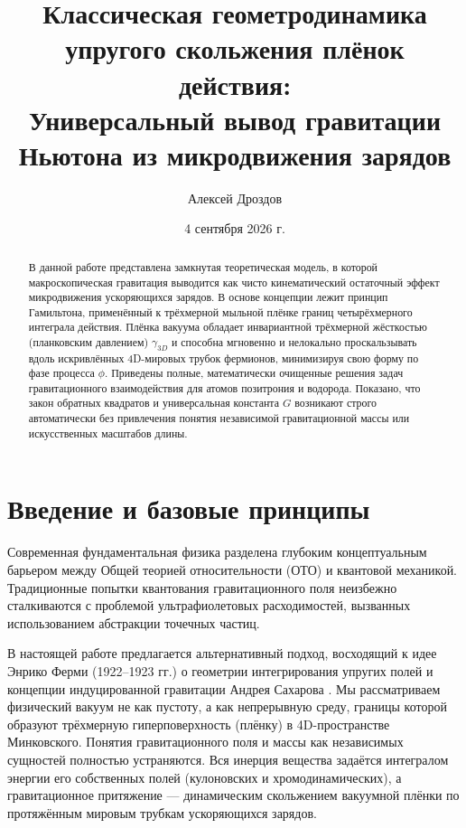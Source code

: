 \documentclass[twocolumn,PRD,amsmath,amssymb,superscriptaddress]{revtex4-1}
\begin{document}
\title{Классическая геометродинамика упругого скольжения плёнок действия:\\Универсальный вывод гравитации Ньютона из микродвижения зарядов}

\author{Алексей Дроздов}

\date{4 сентября 2026 г.}

\begin{abstract}
В данной работе представлена замкнутая теоретическая модель, в которой макроскопическая гравитация выводится как чисто кинематический остаточный эффект микродвижения ускоряющихся зарядов. В основе концепции лежит принцип Гамильтона, применённый к трёхмерной мыльной плёнке границ четырёхмерного интеграла действия. Плёнка вакуума обладает инвариантной трёхмерной жёсткостью (планковским давлением) $\gamma_{3D}$ и способна мгновенно и нелокально проскальзывать вдоль искривлённых 4D-мировых трубок фермионов, минимизируя свою форму по фазе процесса $\phi$. Приведены полные, математически очищенные решения задач гравитационного взаимодействия для атомов позитрония и водорода. Показано, что закон обратных квадратов и универсальная константа $G$ возникают строго автоматически без привлечения понятия независимой гравитационной массы или искусственных масштабов длины.
\end{abstract}

\maketitle

\section{Введение и базовые принципы}
Современная фундаментальная физика разделена глубоким концептуальным барьером между Общей теорией относительности (ОТО) и квантовой механикой. Традиционные попытки квантования гравитационного поля неизбежно сталкиваются с проблемой ультрафиолетовых расходимостей, вызванных использованием абстракции точечных частиц.

В настоящей работе предлагается альтернативный подход, восходящий к идее Энрико Ферми (1922--1923 гг.) о геометрии интегрирования упругих полей \cite{Fermi1923} и концепции индуцированной гравитации Андрея Сахарова \cite{Sakharov1967}. Мы рассматриваем физический вакуум не как пустоту, а как непрерывную среду, границы которой образуют трёхмерную гиперповерхность (плёнку) в 4D-пространстве Минковского. Понятия гравитационного поля и массы как независимых сущностей полностью устраняются. Вся инерция вещества задаётся интегралом энергии его собственных полей (кулоновских и хромодинамических), а гравитационное притяжение --- динамическим скольжением вакуумной плёнки по протяжённым мировым трубкам ускоряющихся зарядов.
\end{document}
